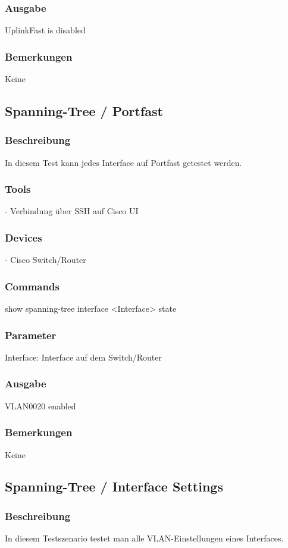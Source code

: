 \documentclass[a4,12pt]{scrartcl}
\begin{document}
\subsubsection{Ausgabe}
UplinkFast is disabled
\subsubsection{Bemerkungen}
Keine


\subsection{Spanning-Tree / Portfast}
\subsubsection{Beschreibung}
In diesem Test kann jedes Interface auf Portfast getestet werden.
\subsubsection{Tools}
- Verbindung über SSH auf Cisco UI 
\subsubsection{Devices}
- Cisco Switch/Router
\subsubsection{Commands}
show spanning-tree interface <Interface> state
\subsubsection{Parameter}
Interface: Interface auf dem Switch/Router
\subsubsection{Ausgabe}
VLAN0020            enabled
\subsubsection{Bemerkungen}
Keine


\subsection{Spanning-Tree / Interface Settings}
\subsubsection{Beschreibung}
In diesem Testszenario testet man alle VLAN-Einstellungen eines Interfaces.
\end{document}
